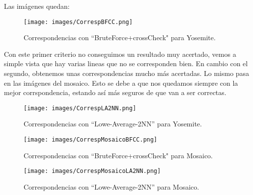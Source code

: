 \documentclass[12pt]{article}
\begin{document}
Las imágenes quedan:\\
\begin{figure}[H]
\centering
\texttt{[image: images/CorrespBFCC.png]} 
\caption{Correspondencias con “BruteForce+crossCheck" para Yosemite.}
\label{etiqueta}
\end{figure}
Con este primer criterio no conseguimos un resultado muy acertado, vemos a simple vista que hay varias lineas que no se corresponden bien. En cambio con el segundo, obtenemos unas correspondencias mucho más acertadas. Lo mismo pasa en las imágenes del mosaico. Esto se debe a que nos quedamos siempre con la mejor corrspondencia, estando así más seguros de que van a ser correctas.
\begin{figure}[H]
\centering
\texttt{[image: images/CorrespLA2NN.png]} 
\caption{Correspondencias con “Lowe-Average-2NN” para Yosemite.}
\label{etiqueta}
\end{figure}
\begin{figure}[H]
\centering
\texttt{[image: images/CorrespMosaicoBFCC.png]} 
\caption{Correspondencias con “BruteForce+crossCheck" para Mosaico.}
\label{etiqueta}
\end{figure}
\begin{figure}[H]
\centering
\texttt{[image: images/CorrespMosaicoLA2NN.png]} 
\caption{Correspondencias con “Lowe-Average-2NN” para Mosaico.}
\label{etiqueta}
\end{figure}
\end{document}
